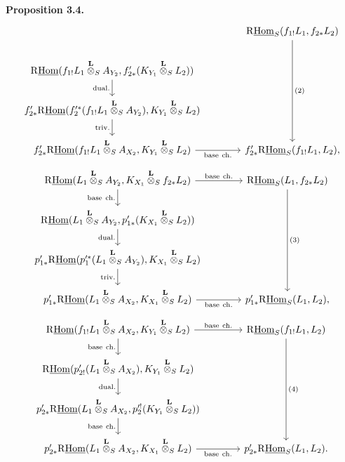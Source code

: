 \documentclass[11pt]{article}
\newenvironment{statement}[1]{\par\medskip\noindent\textbf{#1.}\ }{\par\medskip}
\begin{document}
\begin{statement}{Proposition 3.4}
\[\begin{tikzcd}[column sep=3.7em,row sep=1.7em]
& \mathrm{R}\underline{\mathrm{Hom}}_S(f_{1!}L_1,f_{2*}L_2) \arrow[ddd,"(2)"] \\
\mathrm{R}\underline{\mathrm{Hom}}(f_{1!}L_1\overset{\mathbf L}{\otimes}_S A_{Y_2},f'_{2*}(K_{Y_1}\overset{\mathbf L}{\otimes}_S L_2)) \arrow[d,"\mathrm{dual.}"']
& \\
f'_{2*}\mathrm{R}\underline{\mathrm{Hom}}(f_2'^*(f_{1!}L_1\overset{\mathbf L}{\otimes}_S A_{Y_2}),K_{Y_1}\overset{\mathbf L}{\otimes}_S L_2) \arrow[d,"\mathrm{triv.}"']
& \\
f'_{2*}\mathrm{R}\underline{\mathrm{Hom}}(f_{1!}L_1\overset{\mathbf L}{\otimes}_S A_{X_2},K_{Y_1}\overset{\mathbf L}{\otimes}_S L_2) \arrow[r,"\mathrm{base\ ch.}"']
& f'_{2*}\mathrm{R}\underline{\mathrm{Hom}}_S(f_{1!}L_1,L_2),
\end{tikzcd}
\]
\[
\begin{tikzcd}[column sep=3.7em,row sep=1.7em]
\mathrm{R}\underline{\mathrm{Hom}}(L_1\overset{\mathbf L}{\otimes}_S A_{Y_2},K_{X_1}\overset{\mathbf L}{\otimes}_S f_{2*}L_2)
  \arrow[r,"\mathrm{base\ ch.}"] \arrow[d,"\mathrm{base\ ch.}"']
& \mathrm{R}\underline{\mathrm{Hom}}_S(L_1,f_{2*}L_2) \arrow[ddd,"(3)"] \\
\mathrm{R}\underline{\mathrm{Hom}}(L_1\overset{\mathbf L}{\otimes}_S A_{Y_2},p'_{1*}(K_{X_1}\overset{\mathbf L}{\otimes}_S L_2)) \arrow[d,"\mathrm{dual.}"']
& \\
p'_{1*}\mathrm{R}\underline{\mathrm{Hom}}(p_1'^*(L_1\overset{\mathbf L}{\otimes}_S A_{Y_2}),K_{X_1}\overset{\mathbf L}{\otimes}_S L_2) \arrow[d,"\mathrm{triv.}"']
& \\
p'_{1*}\mathrm{R}\underline{\mathrm{Hom}}(L_1\overset{\mathbf L}{\otimes}_S A_{X_2},K_{X_1}\overset{\mathbf L}{\otimes}_S L_2) \arrow[r,"\mathrm{base\ ch.}"']
& p'_{1*}\mathrm{R}\underline{\mathrm{Hom}}_S(L_1,L_2),
\end{tikzcd}
\]
\[
\begin{tikzcd}[column sep=3.7em,row sep=1.7em]
\mathrm{R}\underline{\mathrm{Hom}}(f_{1!}L_1\overset{\mathbf L}{\otimes}_S A_{X_2},K_{Y_1}\overset{\mathbf L}{\otimes}_S L_2)
  \arrow[r,"\mathrm{base\ ch.}"] \arrow[d,"\mathrm{base\ ch.}"']
& \mathrm{R}\underline{\mathrm{Hom}}_S(f_{1!}L_1,L_2) \arrow[ddd,"(4)"] \\
\mathrm{R}\underline{\mathrm{Hom}}(p'_{2!}(L_1\overset{\mathbf L}{\otimes}_S A_{X_2}),K_{Y_1}\overset{\mathbf L}{\otimes}_S L_2) \arrow[d,"\mathrm{dual.}"']
& \\
p'_{2*}\mathrm{R}\underline{\mathrm{Hom}}(L_1\overset{\mathbf L}{\otimes}_S A_{X_2},p_2'^!(K_{Y_1}\overset{\mathbf L}{\otimes}_S L_2)) \arrow[d,"\mathrm{base\ ch.}"']
& \\
p'_{2*}\mathrm{R}\underline{\mathrm{Hom}}(L_1\overset{\mathbf L}{\otimes}_S A_{X_2},K_{X_1}\overset{\mathbf L}{\otimes}_S L_2) \arrow[r,"\mathrm{base\ ch.}"']
& p'_{2*}\mathrm{R}\underline{\mathrm{Hom}}_S(L_1,L_2).
\end{tikzcd}
\]
\end{statement}
\end{document}
